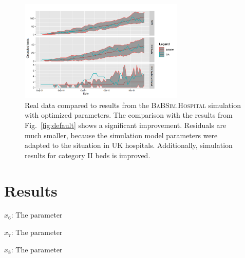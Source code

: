 \documentclass[conference]{IEEEtran}
\newcommand{\babsimhospital}{\textsc{BaBSim.Hospital}\xspace}
\begin{document}
\begin{figure}
    \centering
    \includegraphics[width=0.7\textwidth]{optimized.png}
    \caption{Real data compared to results from the \babsimhospital simulation with optimized parameters. The comparison with the results from Fig.~\ref{fig:default} shows a significant improvement. Residuals are much smaller,
    because the simulation model parameters were adapted to the situation in UK hospitals. Additionally, simulation results for category II beds is improved.  
  }
\label{fig:optimized}
\end{figure}

\section{Results}\label{sec:results}


\begin{compactitem} 
\item[$x_{6}$:] The parameter 
\item[$x_{7}$:] The parameter
\item[$x_{8}$:] The parameter \
\end{compactitem}
\end{document}
